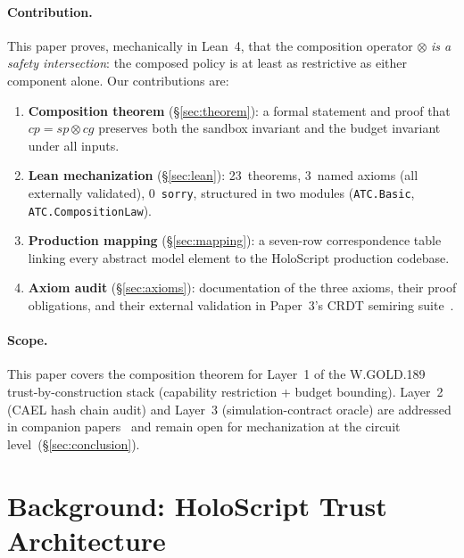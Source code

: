 \documentclass[sigconf]{acmart}
\newcommand{\compose}{\mathbin{\otimes}}
\newcommand{\SP}{\mathit{sp}}
\newcommand{\CG}{\mathit{cg}}
\newcommand{\CP}{\mathit{cp}}
\begin{document}
\paragraph{Contribution.}
This paper proves, mechanically in Lean~4, that the composition operator
$\compose$ \emph{is a safety intersection}: the composed policy is at least as
restrictive as either component alone.  Our contributions are:

\begin{enumerate}
  \item \textbf{Composition theorem} (\S\ref{sec:theorem}): a formal statement
        and proof that $\CP = \SP \compose \CG$ preserves both the sandbox
        invariant and the budget invariant under all inputs.

  \item \textbf{Lean mechanization} (\S\ref{sec:lean}): 23~theorems,
        3~named axioms (all externally validated), 0~\texttt{sorry},
        structured in two modules (\texttt{ATC.Basic},
        \texttt{ATC.CompositionLaw}).

  \item \textbf{Production mapping} (\S\ref{sec:mapping}): a seven-row
        correspondence table linking every abstract model element to the
        HoloScript production codebase.

  \item \textbf{Axiom audit} (\S\ref{sec:axioms}): documentation of the three
        axioms, their proof obligations, and their external validation in
        Paper~3's CRDT semiring suite~\cite{paper-3-crdt-ecoop2027}.
\end{enumerate}

\paragraph{Scope.}
This paper covers the composition theorem for Layer~1 of the W.GOLD.189
trust-by-construction stack (capability restriction + budget bounding).
Layer~2 (CAEL hash chain audit) and Layer~3 (simulation-contract oracle) are
addressed in companion papers~\cite{cael-paper,trust-by-construction} and
remain open for mechanization at the circuit level~(\S\ref{sec:conclusion}).

\section{Background: HoloScript Trust Architecture}
\label{sec:background}
\end{document}
